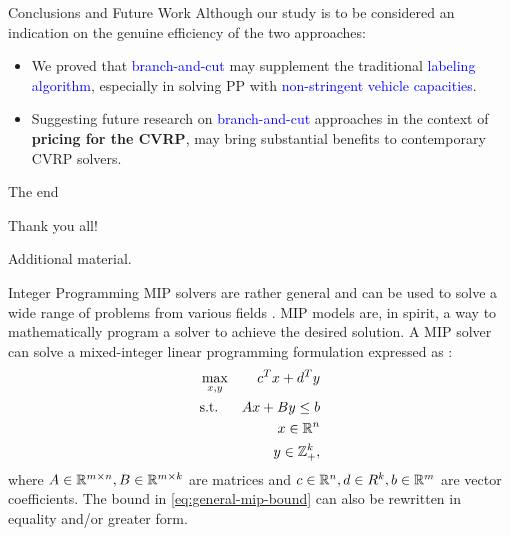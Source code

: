 \begin{frame}{Conclusions and Future Work}
	Although our study is to be considered an indication on the genuine efficiency of the two approaches:
	\begin{itemize}
		\item We proved that \textcolor{blue}{branch-and-cut} may supplement the traditional \textcolor{blue}{labeling algorithm},
		      especially in solving PP with \textcolor{blue}{non-stringent vehicle capacities}.
		\item Suggesting future research on \textcolor{blue}{branch-and-cut} approaches in the context of \textbf{pricing for the CVRP},
		      may bring substantial benefits to contemporary CVRP solvers.
	\end{itemize}
\end{frame}

\begin{frame}{The end}
	\begin{center}
		\begingroup
		\fontsize{18pt}{18pt}\selectfont
		Thank you all!
		\endgroup
	\end{center}
\end{frame}

\appendix

\begin{frame}
\end{frame}

\begin{frame}
	\begin{center}
		\begingroup
		\fontsize{18pt}{18pt}\selectfont
		Additional material.
		\endgroup
	\end{center}
\end{frame}

\begin{frame}{Integer Programming}
	MIP solvers are rather general and can be used to solve a wide range of problems from various fields \parencite{bixby2007progress}.
	MIP models are, in spirit, a way to mathematically program a solver to achieve the desired solution.
	A MIP solver can solve a mixed-integer linear programming formulation
	expressed as \parencite{wolsey1999integer}:
	\begin{align}
		 & \max_{x, y} & c^T x + d^T y                                 \\
		 & \text{s.t.} & A x + B y \le b  \label{eq:general-mip-bound} \\
		 &             & x \in \mathbb R^n                                    \\
		 &             & y \in \mathbb Z_{+}^k,
	\end{align}
	where $A \in \mathbb R^{m \times n}, B \in \mathbb R^{m \times k}$ are matrices and
	$c \in \mathbb R^n, d \in R^k, b \in \mathbb R^m$ are vector coefficients.
	The bound in \cref{eq:general-mip-bound} can also be rewritten in equality and/or greater form.
\end{frame}

